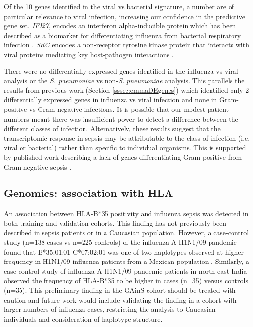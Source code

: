 Of the 10 genes identified in the viral vs bacterial signature, a number are of particular relevance to viral infection, increasing our confidence in the predictive gene set. \textit{IFI27}, encodes an interferon alpha-inducible protein which has been described as a biomarker for differentiating influenza from bacterial respiratory infection \parencite{Tang2017}. \textit{SRC} encodes a non-receptor tyrosine kinase protein that interacts with viral proteins mediating key host-pathogen interactions \parencite{Pagano2013}.

There were no differentially expressed genes identified in the influenza vs viral analysis or the \textit{S. pneumoniae} vs non-\textit{S. pneumoniae} analysis. This parallels the results from previous work (Section \ref{sssec:emmaDEgenes}) which identified only 2 differentially expressed genes in influenza vs viral infection and none in Gram-positive vs Gram-negative infections. It is possible that our modest patient numbers meant there was insufficient power to detect a difference between the different classes of infection. Alternatively, these results suggest that the transcriptomic response in sepsis may be attributable to the class of infection (i.e. viral or bacterial) rather than specific to individual organisms. This is supported by published work describing a lack of genes differentiating Gram-positive from Gram-negative sepsis \parencite{Tang2008}. 

\subsection{Genomics: association with HLA}
An association between HLA-B*35 positivity and influenza sepsis was detected in both training and validation cohorts. This finding has not previously been described in sepsis patients or in a Caucasian population. However, a case-control study (n=138 cases vs n=225 controls) of the influenza A H1N1/09 pandemic found that B*35:01:01-C*07:02:01 was one of two haplotypes observed at higher frequency in H1N1/09 influenza patients from a Mexican population \parencite{Falfan-Valencia2018}. Similarly, a case-control study of influenza A H1N1/09 pandemic patients in north-east India observed the frequency of HLA-B*35 to be higher in cases (n=35) versus controls (n=35). This preliminary finding in the GAinS cohort should be treated with caution and future work would include validating the finding in a cohort with larger numbers of influenza cases, restricting the analysis to Caucasian individuals and consideration of haplotype structure.

